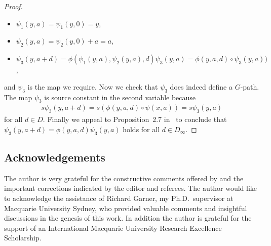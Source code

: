 \documentclass[pdftex]{sigma}
\numberwithin{equation}{section}
\begin{document}
\begin{proof}
\begin{itemize}\itemsep=0pt
\item $\psi_1(y,a)=\psi_1(y,0)=y$,
\item $\psi_2(y,a)=\psi_2(y,0)+a=a$,
\item $\psi_3(y,a+d)=\phi(\psi_1(y,a),\psi_2(y,a),d)\psi_3(y,a)=\phi(y,a,d)\circ\psi_3(y,a))$,
\end{itemize}
and $\psi_3$ is the map we require. Now we check that $\psi_3$ does indeed def\/ine a $G$-path. The map $\psi_3$ is source constant in the second variable because
\begin{gather*}s\psi_3(y,a+d)=s\left(\phi(y,a,d)\circ\psi(x,a)\right)=s\psi_3(y,a)\end{gather*}
for all $d\in D$. Finally we appeal to Proposition~2.7 in~\cite{MR2213027} to conclude that $\psi_3(y,a+d)=\phi(y,a,d)\psi_3(y,a)$ holds for all $d\in D_{\infty}$.
\end{proof}

\subsection*{Acknowledgements}

The author is very grateful for the constructive comments of\/fered by and the important corrections indicated by the editor and referees. The author would like to acknowledge the assistance of Richard Garner, my Ph.D.\ supervisor at Macquarie University Sydney, who provided valuable comments and insightful discussions in the genesis of this work. In addition the author is grateful for the support of an International Macquarie University Research Excellence Scholarship.
\end{document}
